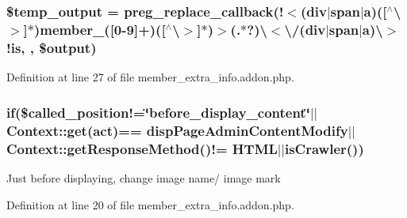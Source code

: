 \subsubsection[{\$temp\+\_\+output}]{\setlength{\rightskip}{0pt plus 5cm}\$temp\+\_\+output = preg\+\_\+replace\+\_\+callback(\textquotesingle{}!$<$(div$\vert$span$\vert$a)(\mbox{[}$^\wedge$\textbackslash{}$>$\mbox{]}$\ast$)member\+\_\+(\mbox{[}0-\/9\mbox{]}+)(\mbox{[}$^\wedge$\textbackslash{}$>$\mbox{]}$\ast$)$>$(.$\ast$?)\textbackslash{}$<$\textbackslash{}/(div$\vert$span$\vert$a)\textbackslash{}$>$!is\textquotesingle{}, \textquotesingle{}, \$output)}\label{member__extra__info_8addon_8php_a5866ef6f77cbeaf87d8208cf805bbc3d}


Definition at line 27 of file member\+\_\+extra\+\_\+info.\+addon.\+php.

\hypertarget{member__extra__info_8addon_8php_a29031816e50a8f742422e671b2bef9b2}{}
\subsubsection[{if}]{\setlength{\rightskip}{0pt plus 5cm}if(\$called\+\_\+position!=\char`\"{}before\+\_\+display\+\_\+content\char`\"{}$\vert$$\vert$Context\+::get(\textquotesingle{}act\textquotesingle{})== \textquotesingle{}disp\+Page\+Admin\+Content\+Modify\textquotesingle{}$\vert$$\vert${\bf Context\+::get\+Response\+Method}()!= \textquotesingle{}H\+T\+M\+L\textquotesingle{}$\vert$$\vert${\bf is\+Crawler}())}\label{member__extra__info_8addon_8php_a29031816e50a8f742422e671b2bef9b2}
Just before displaying, change image name/ image mark 

Definition at line 20 of file member\+\_\+extra\+\_\+info.\+addon.\+php.

